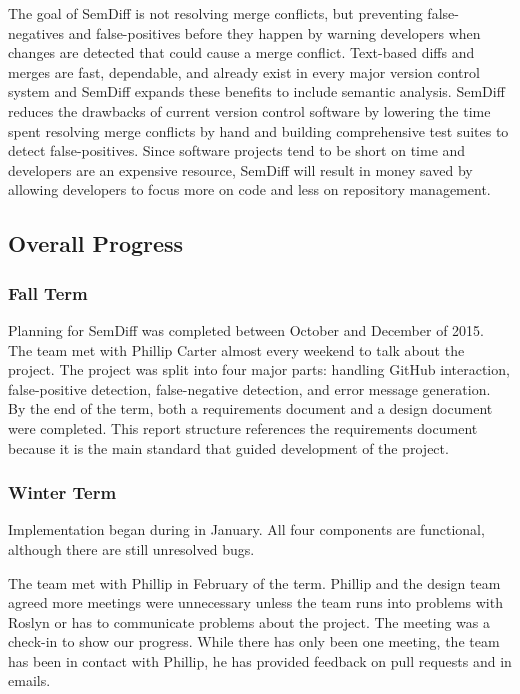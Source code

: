 \documentclass[draftclsnofoot,onecolumn]{IEEEtran}
\begin{document}
The goal of SemDiff is not resolving merge conflicts, but preventing false-negatives and false-positives before they happen by warning developers when changes are detected that could cause a merge conflict. Text-based diffs and merges are fast, dependable, and already exist in every major version control system and SemDiff expands these benefits to include semantic analysis. SemDiff reduces the drawbacks of current version control software by lowering the time spent resolving merge conflicts by hand and building comprehensive test suites to detect false-positives. Since software projects tend to be short on time and developers are an expensive resource, SemDiff will result in money saved by allowing developers to focus more on code and less on repository management.

\subsection{Overall Progress}%

\subsubsection{Fall Term}

Planning for SemDiff was completed between October and December of 2015. The team met with Phillip Carter almost every weekend to talk about the project. The project was split into four major parts: handling GitHub interaction, false-positive detection, false-negative detection, and error message generation. By the end of the term, both a requirements document and a design document were completed. This report structure references the requirements document because it is the main standard that guided development of the project.

\subsubsection{Winter Term}

Implementation began during in January. All four components are functional, although there are still unresolved bugs. 

The team met with Phillip in February of the term. Phillip and the design team agreed more meetings were unnecessary unless the team runs into problems with Roslyn or has to communicate problems about the project. The meeting was a check-in to show our progress. While there has only been one meeting, the team has been in contact with Phillip, he has provided feedback on pull requests and in emails.
\end{document}
